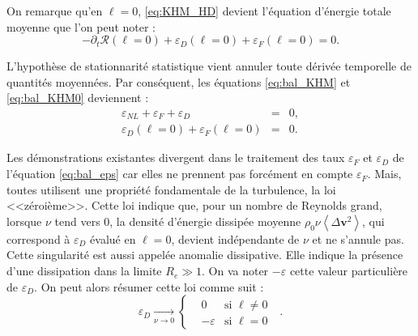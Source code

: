 On remarque qu'en $\boldsymbol{\ell} = 0$, \eqref{eq:KHM_HD} devient l'équation d'énergie totale moyenne que l'on peut noter : 
\begin{equation}
     \label{eq:bal_KHM0} -  \partial_t \mathcal{R}(\boldsymbol{\ell} =0)  + \varepsilon_{D}(\boldsymbol{\ell} =0) +  \varepsilon_{F}(\boldsymbol{\ell} =0) = 0  
.\end{equation} 

L'hypothèse de stationnarité statistique vient annuler toute dérivée temporelle de quantités moyennées. Par conséquent, les équations \eqref{eq:bal_KHM} et \eqref{eq:bal_KHM0} deviennent :  
\begin{eqnarray}
    \label{eq:bal_eps}\varepsilon_{NL} + \varepsilon_{F} + \varepsilon_{D} &=& 0 ,\\
    \label{eq:bal_eps0} \varepsilon_{D}(\boldsymbol{\ell} =0) +  \varepsilon_{F}(\boldsymbol{\ell} =0) &=& 0
.\end{eqnarray}


Les démonstrations existantes divergent dans le traitement des taux $\varepsilon_{F}$ et $\varepsilon_{D}$ de l'équation \eqref{eq:bal_eps} car elles ne prennent pas forcément en compte $\varepsilon_{F}$. Mais, toutes utilisent une propriété fondamentale de la turbulence, la loi <<zéroième>>. Cette loi indique que, pour un nombre de Reynolds grand, lorsque $\nu$ tend vers 0, la densité d'énergie dissipée moyenne $\rho_0 \nu  \left<\Delta\boldsymbol{v}^2\right>$, qui correspond à  $\varepsilon_D$ évalué en $\boldsymbol{\ell} =0$, devient indépendante de $\nu$ et ne s'annule pas. Cette singularité est aussi appelée anomalie dissipative. Elle indique la présence d'une dissipation dans la limite $R_e \gg 1$. On va noter $-\varepsilon$ cette valeur particulière de  $\varepsilon_D$. On peut alors résumer cette loi comme suit : 
\begin{equation}
 \label{eq:zero}  \varepsilon_D  \xrightarrow[\nu \rightarrow 0]{} \left\{
    \begin{aligned}
    & 0 & \textrm{si $\boldsymbol{\ell} \neq 0$ } \\
& - \varepsilon &  \textrm{si $\boldsymbol{\ell} =0$ } 
\end{aligned}
\right. .
\end{equation}

